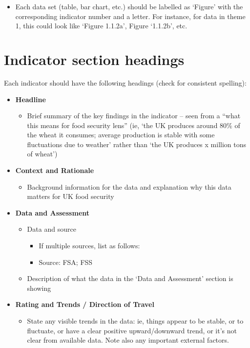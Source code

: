 \documentclass[
]{book}
\providecommand{\tightlist}{%
  \setlength{\itemsep}{0pt}\setlength{\parskip}{0pt}}
\begin{document}
\begin{itemize}
\tightlist
\item
  Each data set (table, bar chart, etc.) should be labelled as `Figure' with the corresponding indicator number and a letter. For instance, for data in theme 1, this could look like `Figure 1.1.2a', Figure `1.1.2b', etc.
\end{itemize}

\hypertarget{indicator-section-headings}{%
\section{Indicator section headings}\label{indicator-section-headings}}

Each indicator should have the following headings (check for consistent spelling):

\begin{itemize}
\item
  \textbf{Headline}

  \begin{itemize}
  \tightlist
  \item
    Brief summary of the key findings in the indicator -- seen from a ``what this means for food security lens'' (ie, `the UK produces around 80\% of the wheat it consumes; average production is stable with some fluctuations due to weather' rather than `the UK produces x million tons of wheat')
  \end{itemize}
\item
  \textbf{Context and Rationale}

  \begin{itemize}
  \tightlist
  \item
    Background information for the data and explanation why this data matters for UK food security
  \end{itemize}
\item
  \textbf{Data and Assessment}

  \begin{itemize}
  \tightlist
  \item
    Data and source

    \begin{itemize}
    \tightlist
    \item
      If multiple sources, list as follows:\\
    \item
      Source: FSA; FSS
    \end{itemize}
  \item
    Description of what the data in the `Data and Assessment' section is showing
  \end{itemize}
\item
  \textbf{Rating and Trends / Direction of Travel}

  \begin{itemize}
  \tightlist
  \item
    State any visible trends in the data: ie, things appear to be stable, or to fluctuate, or have a clear positive upward/downward trend, or it's not clear from available data. Note also any important external factors.
  \end{itemize}
\end{itemize}
\end{document}
